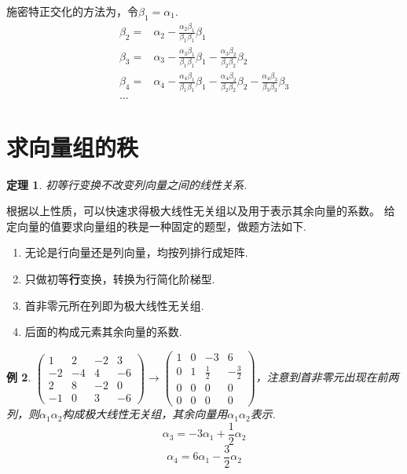 \documentclass[12pt, a4paper, oneside]{ctexbook}
\newtheorem{theorem}{定理}[section]
\newtheorem{example}[theorem]{例}
\begin{document}
施密特正交化的方法为，令$\beta_1 = \alpha_1$. 
$$\begin{aligned}
\beta_2 =& \alpha_2 - \frac{\alpha_2\beta_1}{\beta_1\beta_1}\beta_1 \\
\beta_3 =& \alpha_3 - \frac{\alpha_3\beta_1}{\beta_1\beta_1}\beta_1 - \frac{\alpha_3\beta_2}{\beta_2\beta_2}\beta_2 \\
\beta_4 =& \alpha_4 - \frac{\alpha_4\beta_1}{\beta_1\beta_1}\beta_1 - \frac{\alpha_4\beta_2}{\beta_2\beta_2}\beta_2 - \frac{\alpha_4\beta_3}{\beta_3\beta_3}\beta_3 \\
...
\end{aligned}$$



\section{求向量组的秩}

\begin{theorem}
    初等行变换不改变列向量之间的线性关系. 
\end{theorem}

根据以上性质，可以快速求得极大线性无关组以及用于表示其余向量的系数。
给定向量的值要求向量组的秩是一种固定的题型，做题方法如下. 
\begin{enumerate}
    \item 无论是行向量还是列向量，均按列排行成矩阵. 
    \item 只做初等\textbf{行}变换，转换为行简化阶梯型. 
    \item 首非零元所在列即为极大线性无关组. 
    \item 后面的构成元素其余向量的系数. 
\end{enumerate}

\begin{example}
    $\begin{pmatrix}
        1 & 2 & -2 & 3 \\
        -2 & -4 & 4 & -6 \\
        2 & 8 & -2 & 0 \\
        -1 & 0 & 3 & -6
    \end{pmatrix} \rightarrow \left ( \begin{array}{cccc}
        1 & 0 & -3 & 6 \\
        0 & 1 & \frac{1}{2} & -\frac{3}{2} \\ \hline
        0 & 0 & 0 & 0 \\
        0 & 0 & 0 & 0
    \end{array} \right )$，注意到首非零元出现在前两列，则$\alpha_1 \alpha_2$构成极大线性无关组，其余向量用$\alpha_1 \alpha_2$表示. 
    $$\alpha_3 = -3\alpha_1 + \frac{1}{2}\alpha_2$$
    $$\alpha_4 = 6\alpha_1 -\frac{3}{2}\alpha_2$$
\end{example}
\end{document}
